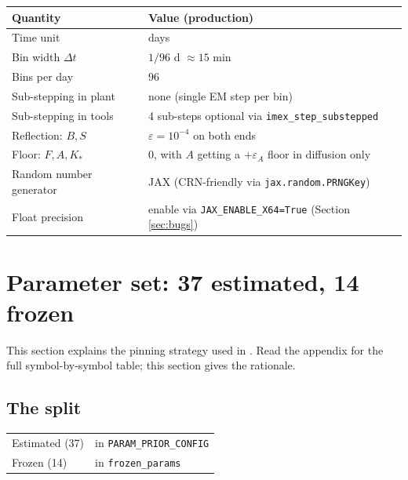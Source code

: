 \documentclass[11pt,a4paper]{article}
\theoremstyle{definition}
\begin{document}
\begin{center}\small
\begin{tabular}{ll}
\toprule
Quantity & Value (production) \\
\midrule
Time unit                 & days \\
Bin width $\Delta t$      & $1/96$ d $\approx 15$ min \\
Bins per day              & $96$ \\
Sub-stepping in plant     & none (single EM step per bin) \\
Sub-stepping in tools     & 4 sub-steps optional via \texttt{imex\_step\_substepped} \\
Reflection: $B, S$        & $\varepsilon = 10^{-4}$ on both ends \\
Floor: $F, A, K_*$        & $0$, with $A$ getting a $+\varepsilon_A$ floor in diffusion only \\
Random number generator   & JAX (CRN-friendly via \texttt{jax.random.PRNGKey}) \\
Float precision           & enable via \texttt{JAX\_ENABLE\_X64=True} (Section \ref{sec:bugs}) \\
\bottomrule
\end{tabular}
\end{center}


\section{Parameter set: 37 estimated, 14 frozen} \label{sec:pinning}

This section explains the pinning strategy used in
. Read the appendix for the full
symbol-by-symbol table; this section gives the rationale.

\subsection{The split}

\begin{center}
\begin{tabular}{ll}
\toprule
Estimated (37) & in \texttt{PARAM\_PRIOR\_CONFIG} \\
Frozen (14)    & in \texttt{frozen\_params} \\
\bottomrule
\end{tabular}
\end{center}
\end{document}
